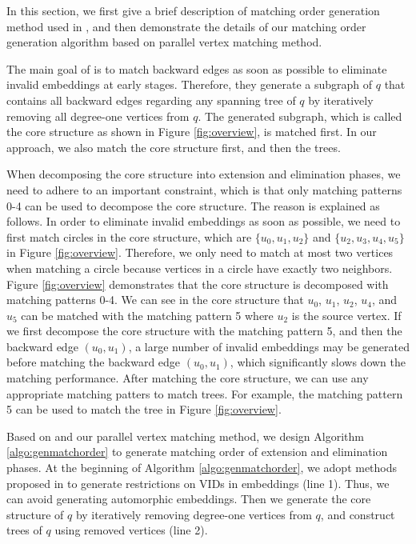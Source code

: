 In this section, we first give a brief description of matching order generation method used in \cite{bi2016efficient}, and then demonstrate the details of our matching order generation algorithm based on parallel vertex matching method.

The main goal of \cite{bi2016efficient} is to match backward edges as soon as possible to eliminate invalid embeddings at early stages. Therefore, they generate a subgraph of $q$ that contains all backward edges regarding any spanning tree of $q$ by iteratively removing all degree-one vertices from $q$. The generated subgraph, which is called the core structure as shown in Figure \ref{fig:overview}, is matched first. In our approach, we also match the core structure first, and then the trees.

When decomposing the core structure into extension and elimination phases, we need to adhere to an important constraint, which is that only matching patterns 0-4 can be used to decompose the core structure. The reason is explained as follows. In order to eliminate invalid embeddings as soon as possible, we need to first match circles in the core structure, which are $\{u_0, u_1, u_2\}$ and $\{u_2, u_3, u_4, u_5\}$ in Figure \ref{fig:overview}. Therefore, we only need to match at most two vertices when matching a circle because vertices in a circle have exactly two neighbors. Figure \ref{fig:overview} demonstrates that the core structure is decomposed with matching patterns 0-4. We can see in the core structure that $u_0$, $u_1$, $u_2$, $u_4$, and $u_5$ can be matched with the matching pattern 5 where $u_2$ is the source vertex. If we first decompose the core structure with the matching pattern 5, and then the backward edge $(u_0, u_1)$, a large number of invalid embeddings may be generated before matching the backward edge $(u_0, u_1)$, which significantly slows down the matching performance. After matching the core structure, we can use any appropriate matching patters to match trees. For example, the matching pattern 5 can be used to match the tree in Figure \ref{fig:overview}.


Based on \cite{bi2016efficient} and our parallel vertex matching method, we design Algorithm \ref{algo:genmatchorder} to generate matching order of extension and elimination phases. At the beginning of Algorithm \ref{algo:genmatchorder}, we adopt methods proposed in \cite{shi2020graphpi,mawhirter2019graphzero} to generate restrictions on VIDs in embeddings (line 1). Thus, we can avoid generating automorphic embeddings. Then we generate the core structure of $q$ by iteratively removing degree-one vertices from $q$, and construct trees of $q$ using removed vertices (line 2).

